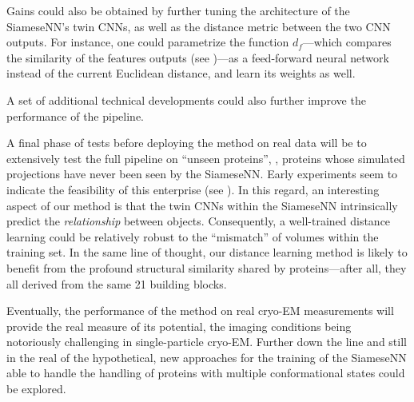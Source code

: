 Gains could also be obtained by further tuning the architecture of the SiameseNN's twin CNNs, as well as the distance metric between the two CNN outputs. For instance, one could parametrize the function $d_f$---which compares the similarity of the features outputs (see )---as a feed-forward neural network instead of the current Euclidean distance, and learn its weights as well.

A set of additional technical developments could also further improve the performance of the pipeline.  

A final phase of tests before deploying the method on real data will be to extensively test the full pipeline on ``unseen proteins'', \ie, proteins whose simulated projections have never been seen by the SiameseNN\@.
Early experiments seem to indicate the feasibility of this enterprise (see ).
In this regard, an interesting aspect of our method is that the twin CNNs within the SiameseNN intrinsically predict the \textit{relationship} between objects. 
Consequently, a well-trained distance learning could be relatively robust to the ``mismatch'' of volumes within the training set.
In the same line of thought, our distance learning method is likely to benefit from the profound structural similarity shared by proteins---after all, they all derived from the same 21 building blocks.

Eventually, the performance of the method on real cryo-EM measurements will provide the real measure of its potential, the imaging conditions being notoriously challenging in single-particle cryo-EM. Further down the line and still in the real of the hypothetical, new approaches for the training of the SiameseNN able to handle the handling of proteins with multiple conformational states could be explored. 



